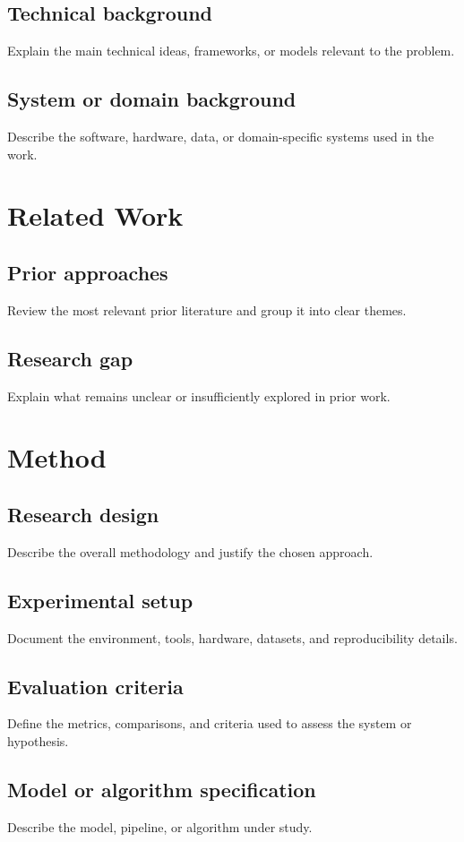 \documentclass[PhD]{uclathes}
\begin{document}
\section{Technical background}
Explain the main technical ideas, frameworks, or models relevant to the problem.

\section{System or domain background}
Describe the software, hardware, data, or domain-specific systems used in the work.

\chapter{Related Work}

\section{Prior approaches}
Review the most relevant prior literature and group it into clear themes.

\section{Research gap}
Explain what remains unclear or insufficiently explored in prior work.

\chapter{Method}

\section{Research design}
Describe the overall methodology and justify the chosen approach.

\section{Experimental setup}
Document the environment, tools, hardware, datasets, and reproducibility details.

\section{Evaluation criteria}
Define the metrics, comparisons, and criteria used to assess the system or hypothesis.

\section{Model or algorithm specification}
Describe the model, pipeline, or algorithm under study.
\end{document}
